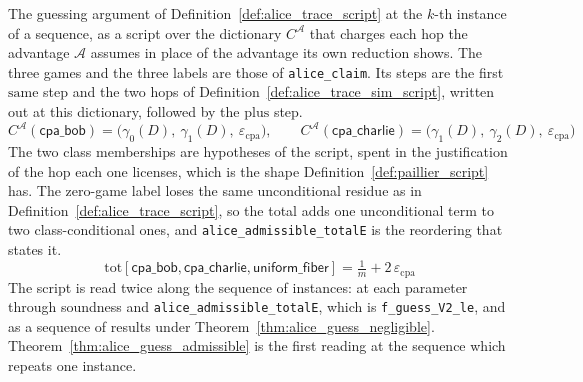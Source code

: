 \begin{definition}
  \label{def:alice_script}
  \rocqok
  The guessing argument of Definition~\ref{def:alice_trace_script} at the
  $k$-th instance of a sequence, as a script over the dictionary
  $C^{\mathcal{A}}$ that charges each hop
  the advantage $\mathcal{A}$ assumes in place of the advantage its own
  reduction shows. The three games and the three labels are those of
  \texttt{alice\_claim}. Its steps are the first $\mathrm{same}$ step and the
  two hops of Definition~\ref{def:alice_trace_sim_script}, written out at this
  dictionary, followed by the $\mathrm{plus}$ step.
  \[ C^{\mathcal{A}}(\mathsf{cpa\_bob})
       = \big(\gamma_0(D),\ \gamma_1(D),\ \varepsilon_{\mathrm{cpa}}\big),
     \qquad
     C^{\mathcal{A}}(\mathsf{cpa\_charlie})
       = \big(\gamma_1(D),\ \gamma_2(D),\ \varepsilon_{\mathrm{cpa}}\big) \]
  The two class memberships are hypotheses of the script, spent in the
  justification of the hop each one licenses, which is the shape
  Definition~\ref{def:paillier_script} has. The zero-game label loses the same
  unconditional residue as in Definition~\ref{def:alice_trace_script}, so the
  total adds one unconditional term to two class-conditional ones, and
  \texttt{alice\_admissible\_totalE} is the reordering that states it.
  \[ \mathrm{tot}[\mathsf{cpa\_bob}, \mathsf{cpa\_charlie},
       \mathsf{uniform\_fiber}]
       = \tfrac{1}{m} + 2\,\varepsilon_{\mathrm{cpa}} \]
  The script is read twice along the sequence of instances: at each parameter
  through soundness and \texttt{alice\_admissible\_totalE}, which is
  \texttt{f\_guess\_V2\_le}, and as a sequence of results under
  Theorem~\ref{thm:alice_guess_negligible}.
  Theorem~\ref{thm:alice_guess_admissible} is the first reading at the
  sequence which repeats one instance.
\end{definition}

